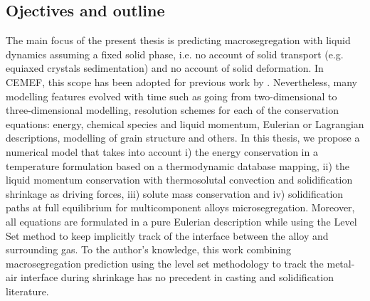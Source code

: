 \subsection{Ojectives and outline}
The main focus of the present thesis is predicting macrosegregation with liquid dynamics assuming a fixed solid phase, i.e. no account of solid 
transport (e.g. equiaxed crystals sedimentation) and no account of solid deformation. In CEMEF, this scope has been adopted for previous 
work by \citet{gouttebroze_modelisation_2005, liu_finite_2005, mosbah_multiple_2008, rivaux_simulation_2011, carozzani_developpement_2012}.
Nevertheless, many modelling features evolved with time such as going from two-dimensional to three-dimensional modelling, resolution schemes
for each of the conservation equations: energy, chemical species and liquid momentum, Eulerian or Lagrangian descriptions, 
modelling of grain structure and others. In this thesis, we propose a numerical model that takes into account 
i) the energy conservation in a temperature formulation based on a thermodynamic database mapping,
ii) the liquid momentum conservation with thermosolutal convection and solidification shrinkage as driving forces, 
iii) solute mass conservation and 
iv) solidification paths at full equilibrium for multicomponent alloys microsegregation. 
Moreover, all equations are formulated in a pure Eulerian description while using the Level Set method to keep 
implicitly track of the interface between the alloy and surrounding gas. To the author's knowledge, this work 
combining macrosegregation prediction using the level set methodology to track the metal-air interface during 
shrinkage has no precedent in casting and solidification literature.



